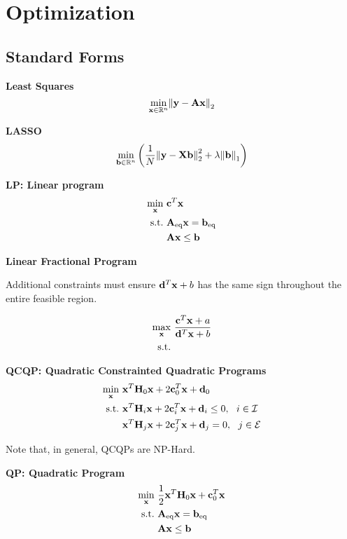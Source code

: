 \chapter{Optimization}

\section{Standard Forms}

\textbf{Least Squares}
\begin{equation}
\min_{\mathbf{x}\in\mathbb{R}^{n}} \norm{\mathbf{y}-\mathbf{A}\mathbf{x}}_2
\end{equation}

\textbf{LASSO}
\begin{equation}
\min_{\mathbf{b}\in\mathbb{R}^{n}} \left(\frac{1}{N}\norm{\mathbf{y}-\mathbf{X}\mathbf{b}}_2^2+\lambda\norm{\mathbf{b}}_1\right)
\end{equation}

\textbf{LP: Linear program}
\begin{align}
\min_{\mathbf{x}}      ~& \mathbf{c}^T \mathbf{x} \\
\textrm{s.t.}   ~& \mathbf{A}_\textrm{eq}\mathbf{x} = \mathbf{b}_\textrm{eq} \\
                ~& \mathbf{A}\mathbf{x} \le \mathbf{b}
\end{align}

\textbf{Linear Fractional Program}
\begin{maxi!}{\vx}{}{}{}
\addConstraint{\mA\vx}{\le \vb}
\end{maxi!}
Additional constraints must ensure $\mathbf{d}^T \mathbf{x} + b$ has the same sign throughout the entire feasible region.

\begin{align}
\max_{\mathbf{x}}      ~& \frac{\mathbf{c}^T\mathbf{x} + a}{\mathbf{d}^T \mathbf{x} + b} \\
\textrm{s.t.}   ~& 
\end{align}

\textbf{QCQP: Quadratic Constrainted Quadratic Programs}
\begin{align}
\min_{\mathbf{x}}      ~& \mathbf{x}^T\mathbf{H}_0\mathbf{x}+2\mathbf{c}_0^T\mathbf{x} + \mathbf{d}_0 \\
\textrm{s.t.}   ~& \mathbf{x}^T\mathbf{H}_i\mathbf{x}+2\mathbf{c}_i^T\mathbf{x} + \mathbf{d}_i \le 0,~~i\in\mathcal{I} \\
                ~& \mathbf{x}^T\mathbf{H}_j\mathbf{x}+2\mathbf{c}_j^T\mathbf{x} + \mathbf{d}_j = 0,~~j\in\mathcal{E}
\end{align}

Note that, in general, QCQPs are NP-Hard.


\textbf{QP: Quadratic Program}
\begin{align}
\min_{\mathbf{x}}      ~& \frac{1}{2}\mathbf{x}^T\mathbf{H}_0\mathbf{x}+\mathbf{c}_0^T\mathbf{x} \\
\textrm{s.t.}   ~& \mathbf{A}_\textrm{eq}\mathbf{x} = \mathbf{b}_\textrm{eq} \\
                ~& \mathbf{A}\mathbf{x} \le \mathbf{b}
\end{align}


